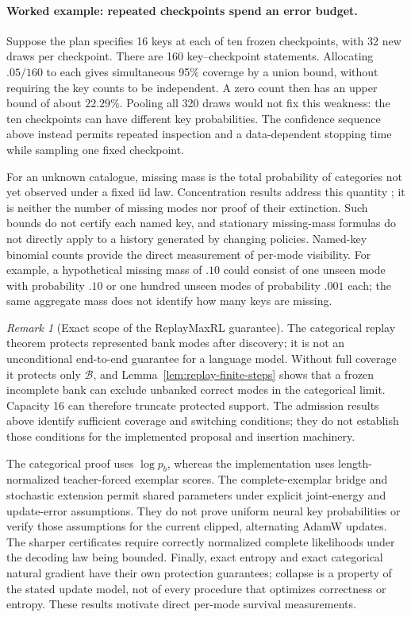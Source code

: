 \documentclass{article}
\newcommand{\1}{\mathbf 1}
\theoremstyle{remark}
\newtheorem{remark}[lemma]{Remark}
\theoremstyle{definition}
\theoremstyle{plain}
\begin{document}
\paragraph{Worked example: repeated checkpoints spend an error budget.}
Suppose the plan specifies 16 keys at each of ten frozen checkpoints, with
32 new draws per checkpoint. There are 160 key--checkpoint statements.
Allocating $.05/160$ to each gives simultaneous 95\% coverage by a union
bound, without requiring the key counts to be independent. A zero count then
has an upper bound of about $22.29\%$. Pooling all 320 draws would not fix
this weakness: the ten checkpoints can have different key probabilities.
The confidence sequence above instead permits repeated inspection and a
data-dependent stopping time while sampling one fixed checkpoint.

For an unknown catalogue, missing mass is the total probability of categories
not yet observed under a fixed iid law. Concentration results address this
quantity \citep{mcallester2003missing,berend2013missing}; it is neither the
number of missing modes nor proof of their extinction. Such bounds do not
certify each named key, and stationary missing-mass formulas do not directly
apply to a history generated by changing policies. Named-key binomial counts
provide the direct measurement of per-mode visibility.
For example, a hypothetical missing mass of $.10$ could consist of one
unseen mode with probability $.10$ or one hundred unseen modes of probability
$.001$ each; the same aggregate mass does not identify how many keys are missing.

\begin{remark}[Exact scope of the ReplayMaxRL guarantee]
The categorical replay theorem protects represented bank modes after discovery;
it is not an unconditional end-to-end guarantee for a language model.
Without full coverage it protects only $\mathcal B$, and
Lemma~\ref{lem:replay-finite-steps} shows that a frozen incomplete bank can
exclude unbanked correct modes in the categorical limit. Capacity 16 can
therefore truncate protected support. The admission results above identify
sufficient coverage and switching conditions; they do not establish those
conditions for the implemented proposal and insertion machinery.

The categorical proof uses $\log p_b$, whereas the implementation uses
length-normalized teacher-forced exemplar scores. The complete-exemplar bridge
and stochastic extension permit shared parameters under explicit joint-energy
and update-error assumptions. They do not prove uniform neural key
probabilities or verify those assumptions for the current clipped, alternating
AdamW updates. The sharper certificates require correctly normalized complete
likelihoods under the decoding law being bounded. Finally, exact entropy and
exact categorical natural gradient have their own protection guarantees;
collapse is a property of the stated update model, not of every procedure that
optimizes correctness or entropy. These results motivate direct per-mode survival measurements.
\end{remark}
\end{document}
